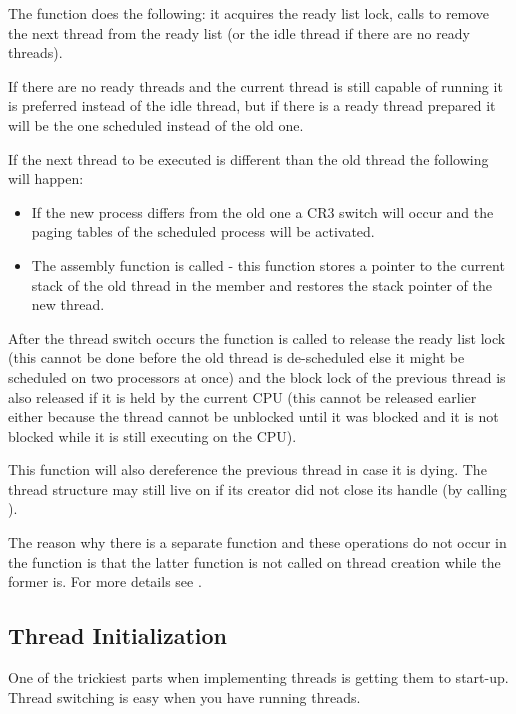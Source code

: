 \begin{appendices}
The  function does the following: it acquires the ready list lock, calls
 to remove the next thread from the ready list (or the idle thread if
there are no ready threads).

If there are no ready threads and the current thread is still capable of running it is preferred
instead of the idle thread, but if there is a ready thread prepared it will be the one scheduled
instead of the old one.

If the next thread to be executed is different than the old thread the following will happen:
\begin{itemize}
	\item If the new process differs from the old one a CR3 switch will occur and the paging tables
of the scheduled process will be activated.
	\item The  assembly function is called - this function stores a pointer to 
the current stack of the old thread in the  member and restores the stack pointer of the
new thread.
\end{itemize}

After the thread switch occurs the  function is called to release
the ready list lock (this cannot be done before the old thread is de-scheduled else it might be
scheduled on two processors at once) and the block lock of the previous thread is also released if
it is held by the current CPU (this cannot be released earlier either because the thread cannot be
unblocked until it was blocked and it is not blocked while it is still executing on the CPU).

This function will also dereference the previous thread in case it is dying. The thread structure
may still live on if its creator did not close its handle (by calling ).

The reason why there is a separate  function and these operations do
not occur in the  function is that the latter function is not called on thread
creation while the former is. For more details see .

\subsection{Thread Initialization}
\label{sect:ThreadInit}

One of the trickiest parts when implementing threads is getting them to start-up. Thread switching
is easy when you have running threads.


\end{appendices}
